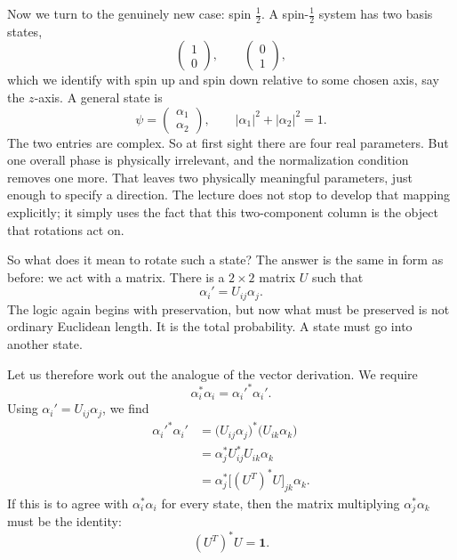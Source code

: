 Now we turn to the genuinely new case: spin \(\frac12\). A spin-\(\frac12\) system has two basis states,
\begin{equation}
\begin{pmatrix}1\\0\end{pmatrix},
\qquad
\begin{pmatrix}0\\1\end{pmatrix},
\end{equation}
which we identify with spin up and spin down relative to some chosen axis, say the \(z\)-axis. A general state is
\begin{equation}
\psi =
\begin{pmatrix}
\alpha_1\\
\alpha_2
\end{pmatrix},
\qquad
|\alpha_1|^2+|\alpha_2|^2=1.
\end{equation}
The two entries are complex. So at first sight there are four real parameters. But one overall phase is physically irrelevant, and the normalization condition removes one more. That leaves two physically meaningful parameters, just enough to specify a direction. The lecture does not stop to develop that mapping explicitly; it simply uses the fact that this two-component column is the object that rotations act on.

So what does it mean to rotate such a state? The answer is the same in form as before: we act with a matrix. There is a \(2\times 2\) matrix \(U\) such that
\begin{equation}
\alpha_i' = U_{ij}\alpha_j.
\end{equation}
The logic again begins with preservation, but now what must be preserved is not ordinary Euclidean length. It is the total probability. A state must go into another state.

Let us therefore work out the analogue of the vector derivation. We require
\begin{equation}
\alpha_i^*\alpha_i = \alpha_i'^*\alpha_i'.
\end{equation}
Using \(\alpha_i' = U_{ij}\alpha_j\), we find
\begin{align}
\alpha_i'^*\alpha_i'
  &= \bigl(U_{ij}\alpha_j\bigr)^*\bigl(U_{ik}\alpha_k\bigr) \\
  &= \alpha_j^* U_{ij}^* U_{ik}\alpha_k \\
  &= \alpha_j^*\bigl[(U^T)^*U\bigr]_{jk}\alpha_k .
\end{align}
If this is to agree with \(\alpha_i^*\alpha_i\) for every state, then the matrix multiplying \(\alpha_j^*\alpha_k\) must be the identity:
\begin{equation}
\left(U^T\right)^*U = \mathbf 1.
\end{equation}

